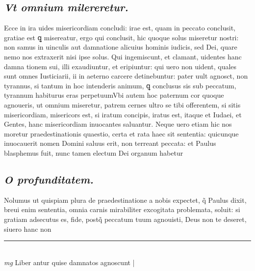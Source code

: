 \documentclass{article}
\begin{document}
\begin{pages}
\subsection*{\textit{Vt omnium milereretur. }}\pstart Ecce in ira uides misericordiam concludi: irae est, quam in peccato conclusit, gratiae est ꝗ misereatur, ergo qui conclusit, hic quoque solus miseretur nostri: non samus in uinculis aut damnatione alicuius hominis iudicis, sed Dei, quare nemo nos extraxerit nisi ipse solus.  Qui ingemiscunt, et clamant, uidentes hanc damna tionem sui, illi exaudiuntur, et eripiuntur: qui uero non uident, quales sunt omnes Iusticiarii, ii in aeterno carcere detinebuntur: pater uult agnosct, non tyrannus, si tantum in hoc intenderis animum, ꝗ conclusus sis sub peccatum, tyrannum habiturus eras perpetuumVbi autem hoc paternum cor quoque agnoueris, ut omnium miseretur, patrem cernes ultro se tibi offerentem, si sitis misericordiam, misericors est, si iratum concipis, iratus est, itaque et Iudaei, et Gentes, hanc misericordiam inuocantes saluantur. Neque uero etiam hic nos moretur praedestinationis quaestio, certa et rata haec sit sententia: quicunque inuocauerit nomen Domini saluus erit, non terreant peccata: et Paulus blasphemus fuit, nunc tamen electum Dei organum habetur\pend
{}
{}
\subsection*{\textit{O profunditatem. }}\pstart Nolumus ut quispiam plura de praedestinatione a nobis expectet, q̃ Paulus dixit, breui enim sententia, omnia carnis mirabiliter excogitata problemata, soluit: si gratiam adsecutus es, fide, postq̃ peccatum tuum agnouisti, Deus non te deseret, siuero hanc non  \pend
\vspace{0.5cm}\noindent
\vspace{0.2cm}\rule{1cm}{0.2pt}\\ 
\hspace{0.2cm}\textit{mg}
\footnotesize Liber antur quise damnatos agnoscunt 
\normalsize| 

\end{pages}
\end{document}

